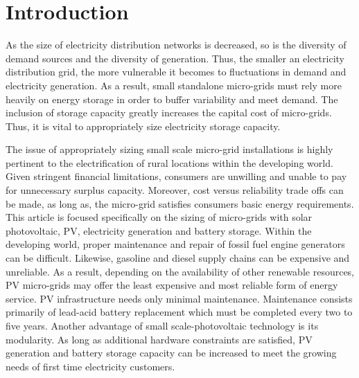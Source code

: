 \documentclass[11p]{article}
\begin{document}
\begin{abstract}

\end{abstract}

\section{Introduction}

As the size of electricity distribution networks is decreased, so is the diversity of demand sources and the diversity of generation.
Thus, the smaller an electricity distribution grid, the more vulnerable it becomes to fluctuations in demand and electricity generation.
As a result, small standalone micro-grids must rely more heavily on energy storage in order to buffer variability and meet demand.  
The inclusion of storage capacity greatly increases the capital cost of micro-grids.
Thus, it is vital to appropriately size electricity storage capacity.

The issue of appropriately sizing small scale micro-grid installations is highly pertinent to the electrification of rural locations within the developing world. 
Given stringent financial limitations, consumers are unwilling and unable to pay for unnecessary surplus capacity. 
Moreover, cost versus reliability trade offs can be made, as long as, the micro-grid satisfies consumers basic energy requirements. \cite{Marawanyika} 
This article is focused specifically on the sizing of micro-grids with solar photovoltaic, PV, electricity generation and battery storage. 
Within the developing world, proper maintenance and repair of fossil fuel engine generators can be difficult. 
Likewise, gasoline and diesel supply chains can be expensive and unreliable.  
As a result, depending on the availability of other renewable resources, PV micro-grids may offer the least expensive and most reliable form of energy service. \cite{Nouni,WB}
PV infrastructure needs only minimal maintenance.
Maintenance consists primarily of lead-acid battery replacement which must be completed every two to five years. 
Another advantage of small scale-photovoltaic technology is its modularity.  
As long as additional hardware constraints are satisfied, PV generation and battery storage capacity can be increased to meet the growing needs of first time electricity customers. \cite{Wamukonya}  
\end{document}
